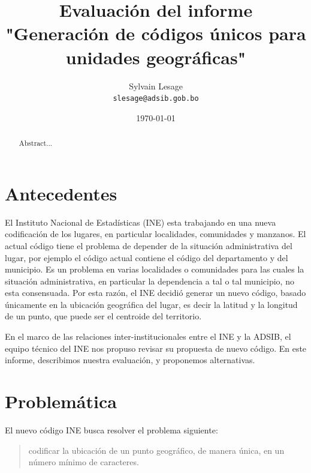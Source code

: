 \documentclass[letterpaper]{article}
\begin{document}
\title{Evaluación del informe\\"Generación de códigos únicos para unidades geográficas"}
\author{Sylvain Lesage\\
  \texttt{slesage@adsib.gob.bo}}
\date{\today}
\maketitle
 
\begin{abstract}
Abstract...
\end{abstract}

\section{Antecedentes}

El Instituto Nacional de Estadísticas (INE) esta trabajando en una 
nueva codificación de los lugares, en particular localidades, 
comunidades y manzanos. El actual código tiene el problema de depender 
de la situación administrativa del lugar, por ejemplo el código 
actual contiene el código del departamento y del municipio. Es un 
problema en varias localidades o comunidades para las cuales la 
situación administrativa, en particular la dependencia a tal o tal 
municipio, no esta consensuada. Por esta razón, el INE decidió 
generar un nuevo código, basado únicamente en la ubicación 
geográfica del lugar, es decir la latitud y la longitud de un punto, 
que puede ser el centroide del territorio.

En el marco de las relaciones inter-institucionales entre el INE y la 
ADSIB, el equipo técnico del INE nos propuso revisar su propuesta de 
nuevo código. En este informe, describimos nuestra evaluación, y 
proponemos alternativas.

\section{Problemática}
\label{sec:problematica}

El nuevo código INE busca resolver el problema siguiente:

\begin{quote}
codificar la ubicación de un punto geográfico, de manera única, en 
un número mínimo de caracteres.
\end{quote}
\end{document}
